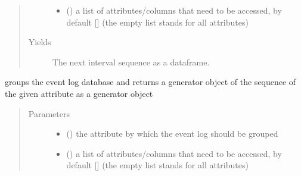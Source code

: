 \documentclass[letterpaper,10pt,english]{sphinxmanual}
\begin{document}
\begin{fulllineitems}
\begin{fulllineitems}
\begin{quote}
\begin{description}
\begin{itemize}
\item {} 
\sphinxAtStartPar
{} (\sphinxstyleliteralemphasis{\sphinxupquote{{[}}}\sphinxstyleliteralemphasis{\sphinxupquote{{]}}}\sphinxstyleliteralemphasis{\sphinxupquote{, }}) \textendash{} a list of attributes/columns that need to be accessed, by default {[}{]} (the empty list stands for all attributes)

\end{itemize}

\item[{Yields}] \leavevmode
\sphinxAtStartPar
{} \textendash{} The next interval sequence as a dataframe.

\end{description}\end{quote}

\end{fulllineitems}


\begin{fulllineitems}
\label{\detokenize{event_log_analyzer:event_log_analyzer.event_log.EventLogStorage.get_sequence}}
\sphinxAtStartPar
groups the event log database and returns a generator object of the sequence of the given attribute as a generator object
\begin{quote}\begin{description}
\item[{Parameters}] \leavevmode\begin{itemize}
\item {} 
\sphinxAtStartPar
{} () \textendash{} the attribute by which the event log should be grouped

\item {} 
\sphinxAtStartPar
{} (\sphinxstyleliteralemphasis{\sphinxupquote{{[}}}\sphinxstyleliteralemphasis{\sphinxupquote{{]}}}\sphinxstyleliteralemphasis{\sphinxupquote{, }}) \textendash{} a list of attributes/columns that need to be accessed, by default {[}{]} (the empty list stands for all attributes)


\end{itemize}
\end{description}
\end{quote}
\end{fulllineitems}
\end{fulllineitems}
\end{document}

